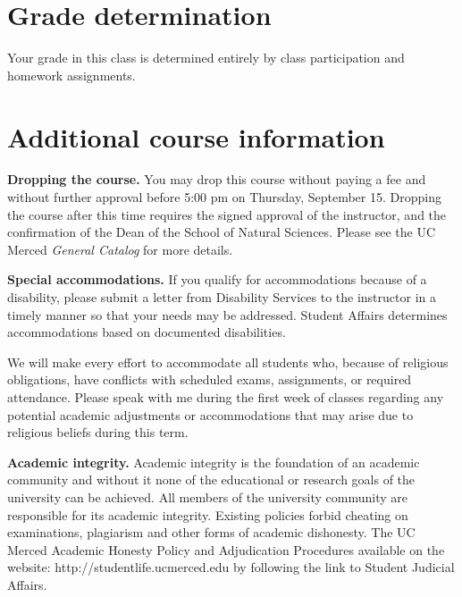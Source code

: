 \documentclass{article}
\newcommand{\secskip}{\vspace{6pt}}
\begin{document}
\section*{Grade determination} 

\begin{description}

\item Your grade in this class is determined entirely by class
  participation and homework assignments.

\end{description}

\section*{Additional course information}

\begin{description}

\item \textbf{Dropping the course.} You may drop this course without
  paying a fee and without further approval before 5:00 pm on
  Thursday, September 15.  Dropping the course after this time
  requires the signed approval of the instructor, and the confirmation
  of the Dean of the School of Natural Sciences. Please see the UC
  Merced \textit{General Catalog} for more details.

\secskip

\item \textbf{Special accommodations.} If you qualify for
  accommodations because of a disability, please submit a letter from
  Disability Services to the instructor in a timely manner so that
  your needs may be addressed.  Student Affairs determines
  accommodations based on documented disabilities.

  We will make every effort to accommodate all students who, because
  of religious obligations, have conflicts with scheduled exams,
  assignments, or required attendance.  Please speak with me during
  the first week of classes regarding any potential academic
  adjustments or accommodations that may arise due to religious
  beliefs during this term.

\secskip

\item \textbf{Academic integrity.}  Academic integrity is the
  foundation of an academic community and without it none of the
  educational or research goals of the university can be achieved.
  All members of the university community are responsible for its
  academic integrity.  Existing policies forbid cheating on
  examinations, plagiarism and other forms of academic dishonesty.
  The UC Merced Academic Honesty Policy and Adjudication Procedures
  available on the website: http://studentlife.ucmerced.edu by
  following the link to Student Judicial Affairs.

\end{description}
\end{document}
